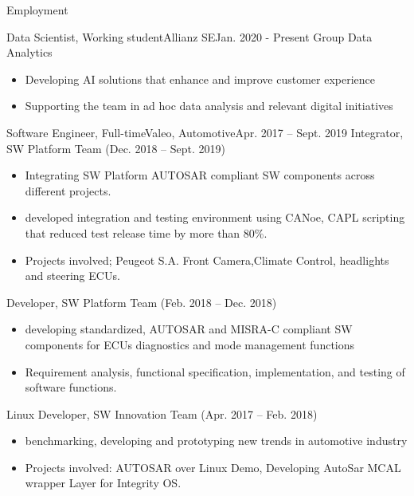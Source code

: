 \documentclass[]{mcdowellcv}
\begin{document}
	\makeheader
	
	\begin{cvsection}{Employment}
		\begin{cvsubsection}{Data Scientist, Working student}{Allianz SE}{Jan. 2020 -  Present}
			Group Data Analytics			
			\begin{itemize}
				\item Developing AI solutions that enhance and improve customer experience
				\item Supporting the team in ad hoc data analysis and relevant digital initiatives
			\end{itemize}
		\end{cvsubsection}
		
		\begin{cvsubsection}{Software Engineer, Full-time}{Valeo, Automotive}{Apr. 2017 -- Sept. 2019}	
			Integrator, SW Platform Team (Dec. 2018 -- Sept. 2019)
			\begin{itemize}
				\item Integrating SW Platform AUTOSAR compliant SW components across different projects.
				\item developed integration and testing environment using CANoe, CAPL scripting that reduced test release time by more than 80\%.
				\item Projects involved; Peugeot S.A. Front Camera,Climate Control, headlights and steering ECUs.
			\end{itemize}
			Developer, SW Platform Team (Feb. 2018 -- Dec. 2018)
			\begin{itemize}
				\item developing standardized, AUTOSAR and MISRA-C compliant SW components for ECUs diagnostics and mode management functions
				\item Requirement analysis, functional specification, implementation, and testing of software functions.
			\end{itemize}
			Linux Developer, SW Innovation Team (Apr. 2017 -- Feb. 2018)
			\begin{itemize}
				\item benchmarking, developing and prototyping new trends in automotive industry 
				\item Projects involved: AUTOSAR over Linux Demo, Developing AutoSar MCAL wrapper Layer for Integrity OS.
			\end{itemize}
			
		\end{cvsubsection}
		

\end{cvsection}
\end{document}
